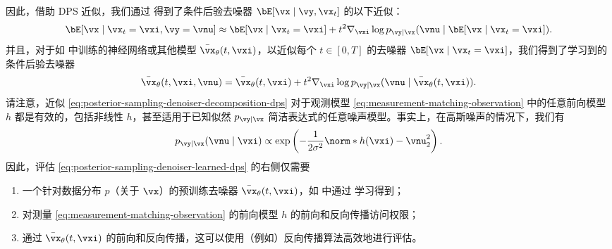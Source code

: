 \documentclass[../../book-main_zh.tex]{subfiles}
\begin{document}
因此，借助 DPS 近似，我们通过
 得到了条件后验去噪器 $\bE[\vx \mid \vy, \vx_t]$ 的以下近似：
\begin{equation}
    \bE[ \vx \mid \vx_t=\vxi, \vy=\vnu]
    \approx
    \bE[\vx \mid \vx_t=\vxi]
    + t^2 \nabla_{\vxi} \log p_{\vy \mid \vx}(\vnu \mid \bE[\vx \mid
    \vx_t = \vxi]).
    \label{eq:posterior-sampling-denoiser-decomposition-dps}
\end{equation}
并且，对于如  中训练的神经网络或其他模型 $\bar{\vx}_{\theta}(t, \vxi)$，以近似每个 $t \in [0, T]$ 的去噪器 $\bE[\vx \mid \vx_t = \vxi]$，我们得到了学习到的条件后验去噪器
\begin{equation}
    \bar{\vx}_{\theta}(t, \vxi, \vnu)
    = \bar{\vx}_{\theta}(t, \vxi)
    + t^2 \nabla_{\vxi} \log p_{\vy \mid \vx}(\vnu \mid \bar{\vx}_{\theta}(t,
    \vxi)).
    \label{eq:posterior-sampling-denoiser-learned-dps}
\end{equation}
请注意，近似
\eqref{eq:posterior-sampling-denoiser-decomposition-dps} 对于观测模型 \eqref{eq:measurement-matching-observation} 中的任意前向模型 $h$ 都是有效的，包括非线性 $h$，甚至适用于已知似然 $p_{\vy
\mid \vx}$ 简洁表达式的任意噪声模型。事实上，在高斯噪声的情况下，我们有
\begin{equation}
    p_{\vy \mid \vx}(\vnu \mid \vxi)
    \propto
    \exp\left(
        -\frac{1}{2\sigma^2} \norm*{ h(\vxi) - \vnu }_2^2
    \right).
\end{equation}
因此，评估
\eqref{eq:posterior-sampling-denoiser-learned-dps} 的右侧仅需要
\begin{enumerate}
    \item 一个针对数据分布 $p$（关于 $\vx$）的预训练去噪器 $\bar{\vx}_{\theta}(t, \vxi)$，如  中通过
         学习得到；
    \item 对测量 \eqref{eq:measurement-matching-observation} 的前向模型 $h$ 的前向和反向传播访问权限；
    \item 通过 $\bar{\vx}_{\theta}(t,
        \vxi)$ 的前向和反向传播，这可以使用（例如）反向传播算法高效地进行评估。
\end{enumerate}
\end{document}
